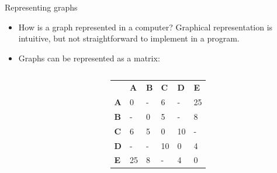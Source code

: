 \documentclass[compress,xcolor=table]{beamer}
\begin{document}
\begin{frame}{Representing graphs}

\begin{itemize}
\item How is a graph represented in a computer? Graphical representation is
  intuitive, but not straightforward to implement in a program.
\item Graphs can be represented as a matrix:
\end{itemize}

    \begin{columns}
        \begin{column}{0.5\linewidth}

        \end{column}
        \begin{column}{0.5\linewidth}
            \begin{tabular}{llllll}
                           & \textbf{A} & \textbf{B} & \textbf{C} & \textbf{D} &
                           \textbf{E} \\
                           \textbf{A} & 0          & -          & 6          & -
                           & 25         \\
                           \textbf{B} & -          & 0          & 5          & -
                           & 8          \\
                           \textbf{C} & 6          & 5          & 0          &
                           10         & -          \\
                           \textbf{D} & -          & -          & 10         & 0
                           & 4          \\
                           \textbf{E} & 25         & 8          & -          & 4
                           & 0         
            \end{tabular}
        \end{column}
    \end{columns}

\end{frame}
\end{document}
